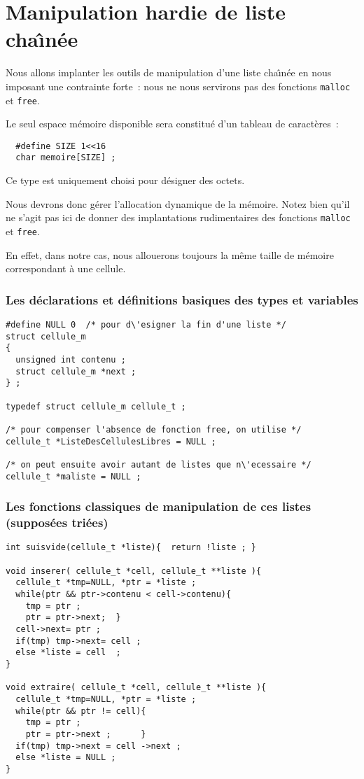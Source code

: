 \section{Manipulation hardie de liste cha\^\i{}n\'ee}%
\begin{frame}[fragile]
  Nous allons implanter les outils de manipulation d'une liste
  cha\^\i{}n\'ee en nous imposant une contrainte forte~: nous ne nous
  servirons pas des fonctions \verb+malloc+ et \verb+free+.
  \par\medskip
  Le seul espace m\'emoire disponible sera constitu\'e d'un tableau de
  caract\`eres~:
\begin{verbatim}
  #define SIZE 1<<16
  char memoire[SIZE] ;
\end{verbatim}
  Ce type est uniquement choisi pour d\'esigner des octets.
  \par\medskip
  Nous devrons donc g\'erer l'allocation dynamique de la m\'emoire.
  Notez bien qu'il ne s'agit pas ici de donner des implantations
  rudimentaires des fonctions \verb+malloc+ et \verb+free+.
  \par\medskip
  En effet, dans notre cas, nous allouerons toujours la m\^eme taille
  de m\'emoire correspondant \`a une cellule.
\end{frame}
\begin{frame}[fragile]
  \frametitle{Les d\'eclarations et d\'efinitions basiques des types et variables}%
\begin{verbatim}
#define NULL 0  /* pour d\'esigner la fin d'une liste */
struct cellule_m
{
  unsigned int contenu ;
  struct cellule_m *next ;
} ;

typedef struct cellule_m cellule_t ;

/* pour compenser l'absence de fonction free, on utilise */
cellule_t *ListeDesCellulesLibres = NULL ;  

/* on peut ensuite avoir autant de listes que n\'ecessaire */
cellule_t *maliste = NULL ;  
\end{verbatim}
\end{frame}
\begin{frame}[fragile]
  \frametitle{Les fonctions classiques de manipulation de ces listes (suppos\'ees tri\'ees)}%
\begin{verbatim}
int suisvide(cellule_t *liste){  return !liste ; }

void inserer( cellule_t *cell, cellule_t **liste ){
  cellule_t *tmp=NULL, *ptr = *liste ;
  while(ptr && ptr->contenu < cell->contenu){
    tmp = ptr ;       
    ptr = ptr->next;  }
  cell->next= ptr ;
  if(tmp) tmp->next= cell ;
  else *liste = cell  ;
}

void extraire( cellule_t *cell, cellule_t **liste ){
  cellule_t *tmp=NULL, *ptr = *liste ;
  while(ptr && ptr != cell){
    tmp = ptr ;
    ptr = ptr->next ;      }
  if(tmp) tmp->next = cell ->next ;
  else *liste = NULL ;
}
\end{verbatim}
\end{frame}
